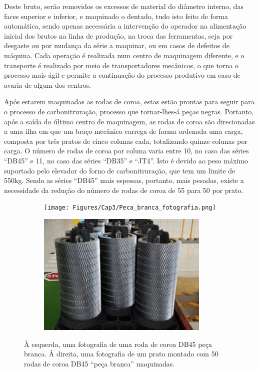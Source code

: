 \par
Deste bruto, serão removidos os excessos de material do diâmetro interno, das faces superior e inferior, e maquinado o dentado, tudo isto feito de forma automática, sendo apenas necessária a intervenção do operador na alimentação inicial dos brutos na linha de produção, na troca das ferramentas, seja por desgaste ou por mudança da série a maquinar, ou em casos de defeitos de máquina. Cada operação é realizada num centro de maquinagem diferente, e o transporte é realizado por meio de transportadores mecânicos, o que torna o processo mais ágil e permite a continuação do processo produtivo em caso de avaria de algum dos centros.

\par
Após estarem maquinadas as rodas de coroa, estas estão prontas para seguir para o processo de carbonitruração, processo que tornar-lhes-á peças negras. Portanto, após a saída do último centro de maquinagem, as rodas de coroa são direcionadas a uma ilha em que um braço mecânico carrega de forma ordenada uma carga, composta por três pratos de cinco colunas cada, totalizando quinze colunas por carga. O número de rodas de coroa por coluna varia entre 10, no caso das séries “DB45” e 11, no caso das séries “DB35” e “JT4”. Isto é devido ao peso máximo suportado pelo elevador do forno de carbonitruração, que tem um limite de 550kg. Sendo as séries “DB45” mais espessas, portanto, mais pesadas, existe a necessidade da redução do número de rodas de coroa de 55 para 50 por prato.
\begin{figure}[htb]
    \centering
    \begin{subfigure}{.45\textwidth}
        \centering
        \texttt{[image: Figures/Cap3/Peca\_branca\_fotografia.png]}
        \caption[]%
        {}
        \label{fig:Peca_branca_fotografia}
    \end{subfigure}%
    \begin{subfigure}{.45\textwidth}
        \centering
        \includegraphics[width = 0.9\textwidth]{Figures/Cap3/Carga_fotografia.png}
        \caption{}
        \label{fig:Carga_peca_branca}
    \end{subfigure}
    \caption[Peça branca final e Prato de Rodas de coroa série DB35]%
    {À esquerda, uma fotografia de uma roda de coroa DB45 peça branca. À direita, uma fotografia de um prato montado com 50 rodas de coroa DB45 “peça branca” maquinadas.}
\end{figure}

